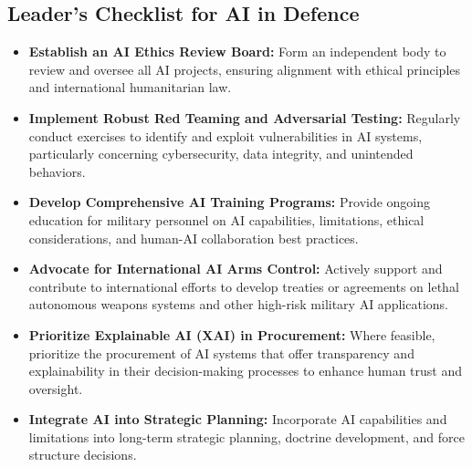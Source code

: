 \subsection{Leader's Checklist for AI in Defence}

\begin{itemize}
    \item \textbf{Establish an AI Ethics Review Board:}
Form an independent body to review and oversee all AI projects, ensuring alignment with ethical principles and international humanitarian law.
    \item \textbf{Implement Robust Red Teaming and Adversarial Testing:}
Regularly conduct exercises to identify and exploit vulnerabilities in AI systems, particularly concerning cybersecurity, data integrity, and unintended behaviors.
    \item \textbf{Develop Comprehensive AI Training Programs:}
Provide ongoing education for military personnel on AI capabilities, limitations, ethical considerations, and human-AI collaboration best practices.
    \item \textbf{Advocate for International AI Arms Control:}
Actively support and contribute to international efforts to develop treaties or agreements on lethal autonomous weapons systems and other high-risk military AI applications.
    \item \textbf{Prioritize Explainable AI (XAI) in Procurement:}
Where feasible, prioritize the procurement of AI systems that offer transparency and explainability in their decision-making processes to enhance human trust and oversight.
    \item \textbf{Integrate AI into Strategic Planning:}
Incorporate AI capabilities and limitations into long-term strategic planning, doctrine development, and force structure decisions.
\end{itemize}
